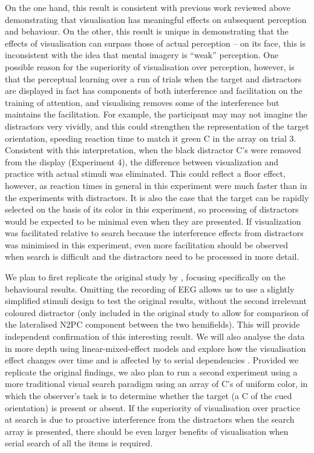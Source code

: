 \documentclass[smallextended]{svjour3}       %
\begin{document}
On the one hand, this result is consistent with previous work reviewed above demonstrating that visualisation has meaningful effects on subsequent perception and behaviour. On the other, this result is unique in demonstrating that the effects of visualisation can surpass those of actual perception -- on its face, this is inconsistent with the idea that mental imagery is ``weak'' perception. One possible reason for the superiority of visualisation over perception, however, is that the perceptual learning over a run of trials when the target and distractors are displayed in fact has components of both interference and facilitation on the training of attention, and visualising removes some of the interference but maintains the facilitation. For example, the participant may may not imagine the distractors very vividly, and this could strengthen the representation of the target orientation, speeding reaction time to match it green C in the array on trial 3. Consistent with this interpretation, when the black distractor C's were removed from the display (Experiment 4), the difference between visualization and practice with actual stimuli was eliminated. This could reflect a floor effect, however, as reaction times in general in this experiment were much faster than in the experiments with distractors. It is also the case that the target can be rapidly selected on the basis of its color in this experiment, so processing of distractors would be expected to be minimal even when they are presented. If visualization was facilitated relative to search because the interference effects from distractors was minimised in this experiment, even more facilitation should be observed when search is difficult and the distractors need to be processed in more detail. 

We plan to first replicate the original study by \cite{reinhart2015}, focusing specifically on the behavioural results. Omitting the recording of EEG allows us to use a slightly simplified stimuli design to test the original results, without the second irrelevant coloured distractor (only included in the original study to allow for comparison of the lateralised N2PC component between the two hemifields). This will provide independent confirmation of this interesting result. We will also analyse the data in more depth using linear-mixed-effect models and explore how the visualisation effect changes over time and is affected by to serial dependencies \citep{fischer-whitney2014}. Provided we replicate the original findings, we also plan to run a second experiment using a more traditional visual search paradigm using an array of C's of uniform color, in which the observer's task is to determine whether the target (a C of the cued orientation) is present or absent. If the superiority of visualisation over practice at search is due to proactive interference from the distractors when the search array is presented, there should be even larger benefits of visualisation when serial search of all the items is required.  
\end{document}
